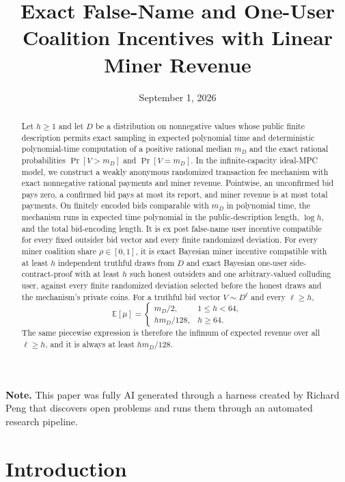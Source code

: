 \documentclass[11pt]{article}
\title{Exact False-Name and One-User Coalition Incentives with Linear Miner Revenue}
\author{}
\date{September 1, 2026}
\begin{document}

\maketitle

\begin{abstract}
Let $h\ge1$ and let $D$ be a distribution on nonnegative values whose public
finite description permits exact sampling in expected polynomial time and
deterministic polynomial-time computation of a positive rational median
$m_D$ and the exact rational probabilities $\Pr[V>m_D]$ and $\Pr[V=m_D]$.
In the infinite-capacity ideal-MPC model, we construct a weakly anonymous
randomized transaction fee mechanism with exact nonnegative rational payments
and miner revenue.  Pointwise, an unconfirmed bid pays zero, a confirmed bid
pays at most its report, and miner revenue is at most total payments.  On
finitely encoded bids comparable with $m_D$ in polynomial time, the mechanism
runs in expected time polynomial in the public-description length, $\log h$,
and the total bid-encoding length.  It is ex post false-name user incentive
compatible for every fixed outsider bid vector and every finite randomized
deviation.  For every miner coalition share $\rho\in[0,1]$, it is exact
Bayesian miner incentive compatible with at least $h$ independent truthful
draws from $D$ and exact Bayesian one-user side-contract-proof with at least
$h$ such honest outsiders and one arbitrary-valued colluding user, against
every finite randomized deviation selected before the honest draws and the
mechanism's private coins.  For a truthful bid vector $V\sim D^\ell$ and every
$\ell\ge h$,
\[
\mathbb{E}[\mu]=
\begin{cases}
m_D/2,&1\le h<64,\\[1ex]
h m_D/128,&h\ge64.
\end{cases}
\]
The same piecewise expression is therefore the infimum of expected revenue
over all $\ell\ge h$, and it is always at least $h m_D/128$.
\end{abstract}

\noindent\textbf{Note.} This paper was fully AI generated through a harness created by Richard Peng that discovers open problems and runs them through an automated research pipeline.

\clearpage
\tableofcontents
\clearpage


\section{Introduction}
\label{sec:introduction}
\end{document}
